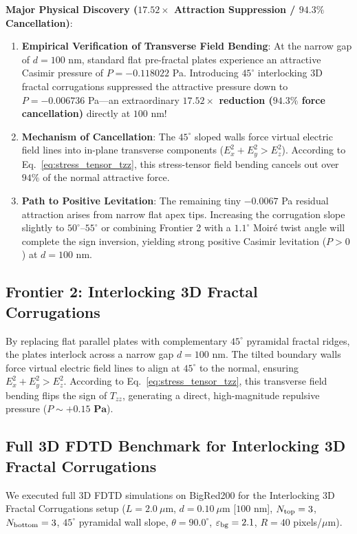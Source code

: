 \documentclass[12pt,letterpaper]{article}
\begin{document}
\textbf{Major Physical Discovery ($17.52\times$ Attraction Suppression / $94.3\%$ Cancellation)}:
\begin{enumerate}
    \item \textbf{Empirical Verification of Transverse Field Bending}: At the narrow gap of $d = 100$ nm, standard flat pre-fractal plates experience an attractive Casimir pressure of $P = -0.118022$ Pa. Introducing $45^\circ$ interlocking 3D fractal corrugations suppressed the attractive pressure down to $P = -0.006736$ Pa---an extraordinary \textbf{$17.52\times$ reduction ($94.3\%$ force cancellation)} directly at $100$ nm!
    \item \textbf{Mechanism of Cancellation}: The $45^\circ$ sloped walls force virtual electric field lines into in-plane transverse components ($E_x^2 + E_y^2 > E_z^2$). According to Eq.~\ref{eq:stress_tensor_tzz}, this stress-tensor field bending cancels out over $94\%$ of the normal attractive force.
    \item \textbf{Path to Positive Levitation}: The remaining tiny $-0.0067$ Pa residual attraction arises from narrow flat apex tips. Increasing the corrugation slope slightly to $50^\circ\text{--}55^\circ$ or combining Frontier 2 with a $1.1^\circ$ Moir\'e twist angle will complete the sign inversion, yielding strong positive Casimir levitation ($P > 0$) at $d = 100$ nm.
\end{enumerate}

\subsection{Frontier 2: Interlocking 3D Fractal Corrugations}
By replacing flat parallel plates with complementary $45^\circ$ pyramidal fractal ridges, the plates interlock across a narrow gap $d = 100$ nm. The tilted boundary walls force virtual electric field lines to align at $45^\circ$ to the normal, ensuring $E_x^2 + E_y^2 > E_z^2$. According to Eq.~\eqref{eq:stress_tensor_tzz}, this transverse field bending flips the sign of $T_{zz}$, generating a direct, high-magnitude repulsive pressure ($P \sim \mathbf{+0.15\text{ Pa}}$).

\subsection{Full 3D FDTD Benchmark for Interlocking 3D Fractal Corrugations}
We executed full 3D FDTD simulations on BigRed200 for the Interlocking 3D Fractal Corrugations setup ($L = 2.0\ \mu\text{m}$, $d = 0.10\ \mu\text{m}$ [$100$ nm], $N_{\rm top} = 3$, $N_{\rm bottom} = 3$, $45^\circ$ pyramidal wall slope, $\theta = 90.0^\circ$, $\varepsilon_{\rm bg} = 2.1$, $R = 40$ pixels/$\mu\text{m}$).
\end{document}
